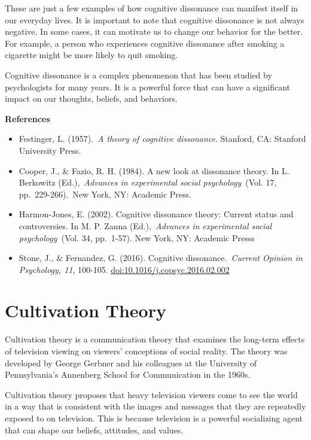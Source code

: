 \documentclass[
  b5paper]{book}
\begin{document}
These are just a few examples of how cognitive dissonance can manifest itself in our everyday lives. It is important to note that cognitive dissonance is not always negative. In some cases, it can motivate us to change our behavior for the better. For example, a person who experiences cognitive dissonance after smoking a cigarette might be more likely to quit smoking.

Cognitive dissonance is a complex phenomenon that has been studied by psychologists for many years. It is a powerful force that can have a significant impact on our thoughts, beliefs, and behaviors.

\textbf{References}

\begin{itemize}
\item
  Festinger, L. (1957).~\emph{A theory of cognitive dissonance}. Stanford, CA: Stanford University Press.
\item
  Cooper, J., \& Fazio, R. H. (1984). A new look at dissonance theory. In L. Berkowitz (Ed.),~\emph{Advances in experimental social psychology}~(Vol. 17, pp.~229-266).~New York, NY: Academic Press.
\item
  Harmon-Jones, E. (2002). Cognitive dissonance theory: Current status and controversies. In M. P. Zanna (Ed.),~\emph{Advances in experimental social psychology}~(Vol. 34, pp.~1-57). New York, NY: Academic Presss
\item
  Stone, J., \& Fernandez, G. (2016). Cognitive dissonance.~\emph{Current Opinion in Psychology, 11}, 100-105. \url{doi:10.1016/j.copsyc.2016.02.002}
\end{itemize}

\hypertarget{cultivation-theory}{%
\section{Cultivation Theory}\label{cultivation-theory}}

Cultivation theory is a communication theory that examines the long-term effects of television viewing on viewers' conceptions of social reality. The theory was developed by George Gerbner and his colleagues at the University of Pennsylvania's Annenberg School for Communication in the 1960s.

Cultivation theory proposes that heavy television viewers come to see the world in a way that is consistent with the images and messages that they are repeatedly exposed to on television. This is because television is a powerful socializing agent that can shape our beliefs, attitudes, and values.
\end{document}
